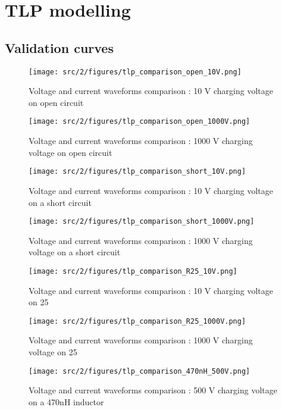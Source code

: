 \chapter{TLP modelling}
\section{Validation curves}
\label{apx:tlp-validation-curves}

\begin{figure}[!h]
  \centering
  \texttt{[image: src/2/figures/tlp\_comparison\_open\_10V.png]}
  \caption{Voltage and current waveforms comparison : 10 V charging voltage on open circuit}
  \label{fig:comparison-tlp-open-10v}
\end{figure}

\begin{figure}[!h]
  \centering
  \texttt{[image: src/2/figures/tlp\_comparison\_open\_1000V.png]}
  \caption{Voltage and current waveforms comparison : 1000 V charging voltage on open circuit}
  \label{fig:comparison-tlp-open-1000V}
\end{figure}

\begin{figure}[!h]
  \centering
  \texttt{[image: src/2/figures/tlp\_comparison\_short\_10V.png]}
  \caption{Voltage and current waveforms comparison : 10 V charging voltage on a short circuit}
  \label{fig:comparison-tlp-short-10V}
\end{figure}

\begin{figure}[!h]
  \centering
  \texttt{[image: src/2/figures/tlp\_comparison\_short\_1000V.png]}
  \caption{Voltage and current waveforms comparison : 1000 V charging voltage on a short circuit}
  \label{fig:comparison-tlp-short-1000V}
\end{figure}

\begin{figure}[!h]
  \centering
  \texttt{[image: src/2/figures/tlp\_comparison\_R25\_10V.png]}
  \caption{Voltage and current waveforms comparison : 10 V charging voltage on 25\textOmega{}}
  \label{fig:comparison-tlp-load-10v}
\end{figure}

\begin{figure}[!h]
  \centering
  \texttt{[image: src/2/figures/tlp\_comparison\_R25\_1000V.png]}
  \caption{Voltage and current waveforms comparison : 1000 V charging voltage on 25\textOmega{}}
  \label{fig:comparison-tlp-load-1000v}
\end{figure}

\begin{figure}[!h]
  \centering
  \texttt{[image: src/2/figures/tlp\_comparison\_470nH\_500V.png]}
  \caption{Voltage and current waveforms comparison : 500 V charging voltage on a 470nH inductor}
  \label{fig:comparison-tlp-inductor}
\end{figure}
